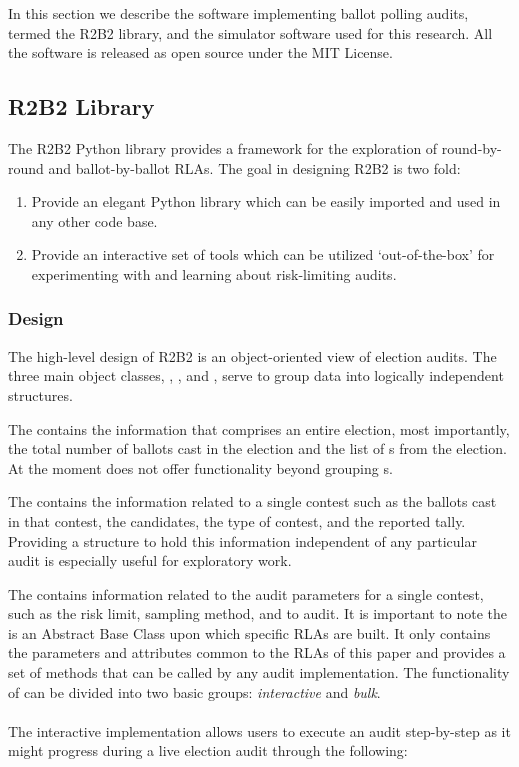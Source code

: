 In this section we describe the software implementing ballot polling audits, termed the R2B2 library, and the simulator software used for this research. All the software is released as open source under the MIT License.
\subsection{R2B2 Library}

The R2B2 Python library \cite{r2b2} provides a framework for the exploration of round-by-round
and ballot-by-ballot RLAs. The goal in designing R2B2 is two fold:
\begin{enumerate}
    \item Provide an elegant Python library which can be easily imported and used
    in any other code base.
    \item Provide an interactive set of tools which can be utilized `out-of-the-box'
    for experimenting with and learning about risk-limiting audits.
\end{enumerate}

\subsubsection{Design}

The high-level design of R2B2 is an object-oriented view of election audits.
The three main object classes, , , and ,
serve to group data into logically independent structures.

The  contains the information that comprises an entire election,
most importantly, the total number of ballots cast in the election and the list
of s from the election. At the moment  does not offer
functionality beyond grouping s.

The  contains the information related to a single
contest such as the ballots cast in that contest, the candidates, the type of contest,
and the reported tally. Providing a structure to hold this information independent of
any particular audit is especially useful for exploratory work.

The  contains information related to the audit parameters for a single contest, 
such as the risk limit, sampling method, and  to audit. It is important
to note the  is an Abstract Base Class upon which specific RLAs are built.
It only contains the parameters and attributes common to the RLAs of this paper and provides a set
of methods that can be called by any audit implementation. The functionality of
 can be divided into two basic groups: \textit{interactive}
and \textit{bulk}.\\
\\
The interactive implementation allows users to execute an audit step-by-step as it
might progress during a live election audit through the following:

